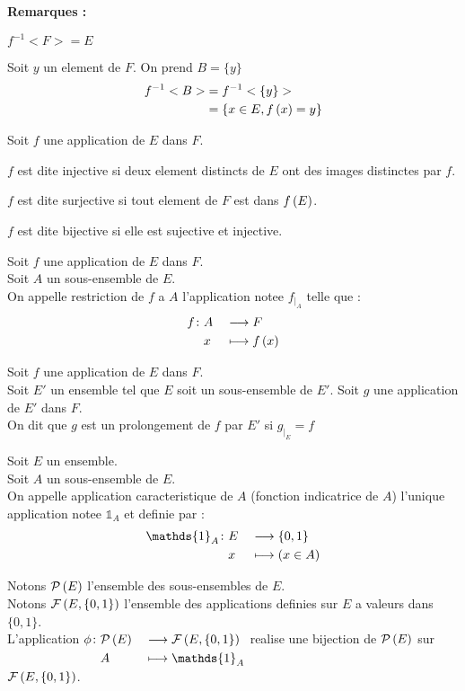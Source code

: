 \documentclass[12pt,twoside,a4paper]{article}
\begin{document}
		\textbf{Remarques :}
		\begin{liste}
			\item $f^{-1}<F> = E$
			\item Soit $y$ un element de $F$. On prend $B=\{y\}$
				$$\begin{aligned}
					f^{-1}<B>&=f^{-1}<\{y\}>\\
							 &=\{x\in E, f\left(x\right)=y\}
				\end{aligned}$$
		\end{liste}
		\begin{defi}
			Soit $f$ une application de $E$ dans $F$.
			\begin{liste}
				\item $f$ est dite injective si deux element distincts de $E$ ont des images distinctes par $f$.
				\item $f$ est dite surjective si tout element de $F$ est dans $f\left(E\right)$.
				\item $f$ est dite bijective si elle est sujective et injective.
			\end{liste}
		\end{defi}
		\begin{defi}
			\begin{liste}
				\item Soit $f$ une application de $E$ dans $F$. \\
					Soit $A$ un sous-ensemble de $E$. \\
					On appelle restriction de $f$ a $A$ l'application notee $f_{|_A}$ telle que :
					$$\begin{aligned}[t]f\colon&A&&\longrightarrow F \\&x&&\longmapsto f\left(x\right)\end{aligned}$$
				\item Soit $f$ une application de $E$ dans $F$. \\
					Soit $E'$ un ensemble tel que $E$ soit un sous-ensemble de $E'$.
					Soit $g$ une application de $E'$ dans $F$. \\
					On dit que $g$ est un prolongement de $f$ par $E'$ si $g_{|_E}=f$
			\end{liste}
		\end{defi}\newpage
		\begin{defi}
			Soit $E$ un ensemble. \\
			Soit $A$ un sous-ensemble de $E$. \\
			On appelle application caracteristique de $A$ (fonction indicatrice de $A$) l'unique application notee $\mathds{1}_A$ et definie par :
			$$\fonction{\mathds{1}_A}{E}{\{0,1\}}{x}{\lf{x\in A}}$$
		\end{defi}
		\begin{prop}
			Notons $\mathcal{P}\left(E\right)$ l'ensemble des sous-ensembles de $E$. \\
			Notons $\mathcal{F}\left(E,\{0,1\}\right)$ l'ensemble des applications definies sur $E$ a valeurs dans $\{0,1\}$. \\
			L'application $\fonction{\phi}{\mathcal{P}\lf{E}}{\mathcal{F}\lf{E,\{0,1\}}}{A}{\mathds{1}_A}$ realise une bijection de $\mathcal{P}\left(E\right)$ sur $\mathcal{F}\left(E,\{0,1\}\right)$.
		\end{prop}
\end{document}
